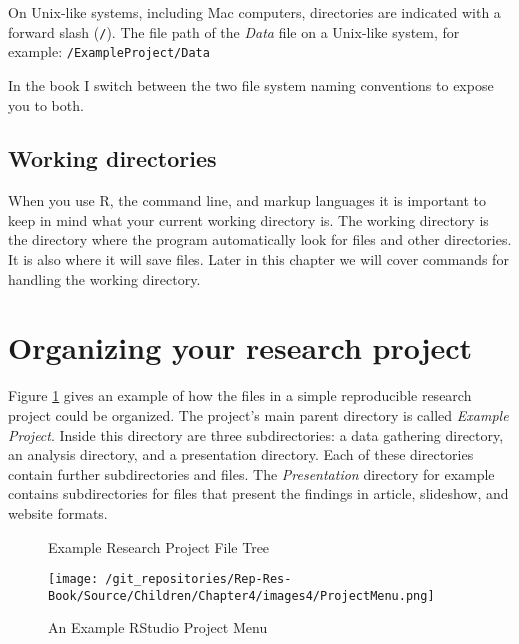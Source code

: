 {On Unix-like systems, including Mac computers, directories are indicated with a forward slash (\texttt{/}). The file path of the {\emph{Data}} file on a Unix-like system, for example: \texttt{/ExampleProject/Data}

In the book I switch between the two file system naming conventions to expose you to both.

\subsection{Working directories}

When you use R, the command line, and markup languages it is important to keep in mind what your current working directory is. The working directory is the directory where the program automatically look for files and other directories. It is also where it will save files. Later in this chapter we will cover commands for handling the working directory.

\section{Organizing your research project}

Figure \ref{ExampleTree} gives an example of how the files in a simple reproducible research project could be organized. The project's main parent directory is called {\emph{Example Project}}. Inside this directory are three subdirectories: a data gathering directory, an analysis directory, and a presentation directory. Each of these directories contain further subdirectories and files. The {\emph{Presentation}} directory for example contains subdirectories for files that present the findings in article, slideshow, and website formats.

\clearpage
\thispagestyle{plain}
\begin{landscape}
\begin{figure}[th!]
    \caption{Example Research Project File Tree}
    \label{ExampleTree}
    \begin{center}
    
    
    \end{center}
\end{figure}
\end{landscape}

\begin{wrapfigure}{r}{0.4\textwidth}
    \caption{An Example RStudio Project Menu}
    \label{ProjectMenu}
    \begin{center}
    \texttt{[image: /git\_repositories/Rep-Res-Book/Source/Children/Chapter4/images4/ProjectMenu.png]}
    \end{center}
\end{wrapfigure}


}
